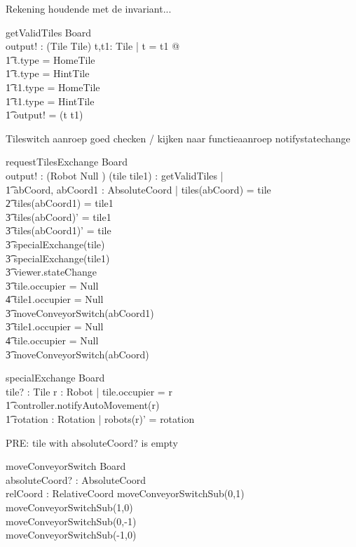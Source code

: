 \documentclass[a4paper,11pt]{article}
\begin{document}
Rekening houdende met de invariant...
\begin{schema}{getValidTiles}
\Xi Board \\
output! : (Tile \cross Tile)
\where
\exists t,t1: Tile | t \not = t1  @ \\ \t1
t.type \not = HomeTile \\ \t1
t.type \not = HintTile \\ \t1
t1.type \not = HomeTile \\ \t1
t1.type \not = HintTile \implies \\ \t1
output! = (t \cross t1)
\end{schema}

Tileswitch aanroep goed checken / kijken naar functieaanroep notifystatechange
\begin{schema}{requestTilesExchange}
\Delta Board \\
output! : ({Robot \union Null} )
\where
\exists (tile \cross tile1) : getValidTiles | \\ \t1
\exists abCoord, abCoord1 : AbsoluteCoord | tiles(abCoord) = tile \\ \t2
tiles(abCoord1) = tile1 \implies \\ \t3
tiles(abCoord)' = tile1 \\ \t3
tiles(abCoord1)' = tile \\ \t3
specialExchange(tile) \\ \t3
specialExchange(tile1) \\ \t3
viewer.stateChange \\ \t3
\IF tile.occupier = Null \\ \t4
tile1.occupier \not = Null\\ \t3
\THEN moveConveyorSwitch(abCoord1) \\ \t3
\IF tile1.occupier = Null \\ \t4
tile.occupier \not = Null \\ \t3
\THEN moveConveyorSwitch(abCoord)
\end{schema}

\begin{schema}{specialExchange}
\Delta Board \\
tile? : Tile
\where
\exists r : Robot | tile.occupier = r \implies \\ \t1
controller.notifyAutoMovement(r) \\ \t1
\exists rotation : Rotation | robots(r)' = rotation 
\end{schema}


PRE: tile with absoluteCoord? is empty
\begin{schema}{moveConveyorSwitch}
\Delta Board \\
absoluteCoord? : AbsoluteCoord \\
relCoord : RelativeCoord
\where
moveConveyorSwitchSub(0,1) \\
moveConveyorSwitchSub(1,0) \\
moveConveyorSwitchSub(0,-1) \\
moveConveyorSwitchSub(-1,0) \\
\end{schema}
\end{document}
